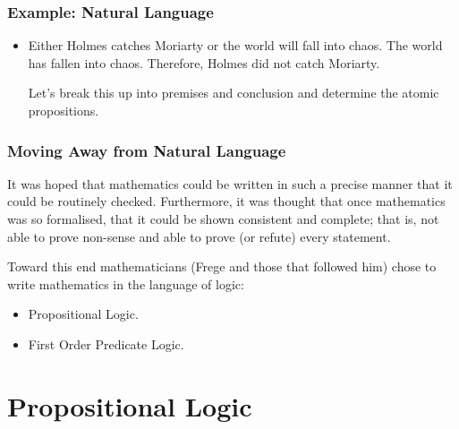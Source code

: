 \documentclass{beamer}
\begin{document}
\begin{frame}
	\frametitle{Example: Natural Language}
	
	\begin{itemize}
		\item Either Holmes catches Moriarty or the world will fall into chaos. The world has fallen into chaos. Therefore, Holmes did not catch Moriarty.
		
		\vspace{5mm}
		
		Let's break this up into premises and conclusion and determine the atomic propositions.
		
		\vspace{50mm}
		
		
	\end{itemize}
\end{frame}

\begin{frame}
	\frametitle{Moving Away from Natural Language}
	
	
	It was hoped that mathematics could be written in such a precise manner that it could be routinely checked. Furthermore, it was thought that once mathematics was so formalised, that it could be shown consistent and complete; that is, not able to prove non-sense and able to prove (or refute) every statement. 

	Toward this end mathematicians (Frege and those that followed him) chose to write mathematics in the language of logic: 

	\begin{itemize}
		\item Propositional Logic.
		\item First Order Predicate Logic.
	\end{itemize}

	\vspace{40mm}
	
	
\end{frame}

\section{Propositional Logic}
\end{document}
